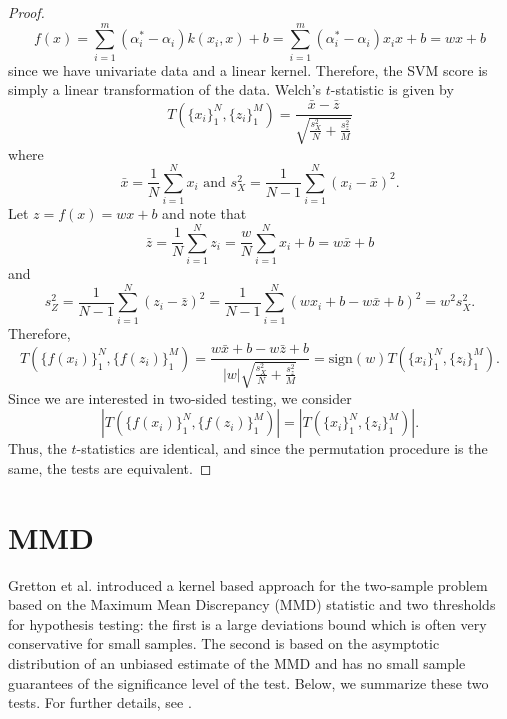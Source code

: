 \documentclass{article} %
\theoremstyle{remark}
\begin{document}
\begin{proof}
  \begin{equation*}
    f(x)=\sum_{i=1}^m(\alpha_i^*-\alpha_i)k(x_i,x)+b =
    \sum_{i=1}^m(\alpha_i^*-\alpha_i)x_ix+b = wx+b
  \end{equation*}
  since we have univariate data and a linear kernel.
  Therefore, the SVM score is simply a linear transformation of the
  data.  Welch's $t$-statistic is given by
  \begin{equation*}
    T(\{x_i\}_1^N,\{z_i\}_1^M) = \frac{\bar{x}-\bar{z}}{\sqrt{\frac{s_X^2}{N}+\frac{s_z^2}{M}}}
  \end{equation*}
  where 
  \begin{equation*}
    \bar{x}=\frac{1}{N}\sum_{i=1}^N x_i \text{ and }
    s_X^2= \frac{1}{N-1}\sum_{i=1}^N(x_i-\bar{x})^2.
  \end{equation*}
  Let $z=f(x)=wx+b$ and note that 
  \begin{equation*}
    \bar{z}=\frac{1}{N}\sum_{i=1}^N z_i = \frac{w}{N}\sum_{i=1}^N x_i
    + b = w\bar{x}+b
  \end{equation*}
  and 
  \begin{equation*}
    s_Z^2= \frac{1}{N-1}\sum_{i=1}^N(z_i-\bar{z})^2= \frac{1}{N-1}\sum_{i=1}^N(wx_i+b-w\bar{x}+b)^2=w^2s_X^2.
  \end{equation*}
  Therefore, 
  \begin{equation*}
    T(\{f(x_i)\}_1^N,\{f(z_i)\}_1^M) =
    \frac{w\bar{x}+b-w\bar{z}+b}{|w|\sqrt{\frac{s_X^2}{N}+\frac{s_z^2}{M}}}
    = \text{sign}(w) T(\{x_i\}_1^N,\{z_i\}_1^M).
  \end{equation*}
  Since we are interested in two-sided testing, we consider
  \begin{equation*}
    |T(\{f(x_i)\}_1^N,\{f(z_i)\}_1^M)| = |T(\{x_i\}_1^N,\{z_i\}_1^M)|.
  \end{equation*}
  Thus, the $t$-statistics are identical, and since the permutation
  procedure is the same, the tests are equivalent.
\end{proof}

\section{MMD}
Gretton et al. \cite{gretton19m} introduced a kernel based approach for
the two-sample problem based on the Maximum Mean Discrepancy (MMD)
statistic and two thresholds for hypothesis testing: the first is a
large deviations bound which is often very conservative for small
samples.  The second is based on the asymptotic distribution of an
unbiased estimate of the MMD and has no small sample guarantees of the
significance level of the test.  Below, we summarize these two tests.
For further details, see \cite{gretton19m}.
\end{document}
